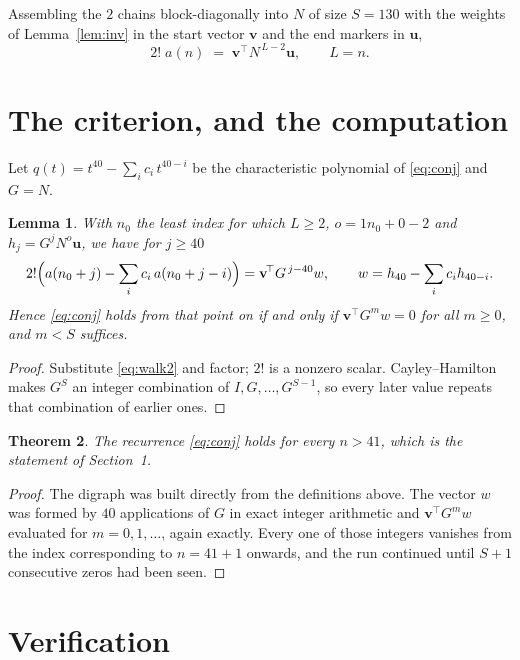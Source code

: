 \documentclass[11pt,a4paper]{article}
\theoremstyle{plain}
\newtheorem{theorem}{Theorem}
\newtheorem{lemma}[theorem]{Lemma}
\theoremstyle{definition}
\begin{document}
Assembling the $2$ chains block-diagonally into $N$ of size $S=130$ with the weights of
Lemma~\ref{lem:inv} in the start vector $\mathbf{v}$ and the end markers in
$\mathbf{u}$,
\begin{equation}\label{eq:walk2}
2!\;a(n)\;=\;\mathbf{v}^{\!\top}N^{\,L-2}\mathbf{u},\qquad L=n .
\end{equation}

\section{The criterion, and the computation}

Let $q(t)=t^{40}-\sum_i c_i\,t^{40-i}$ be the characteristic polynomial of
\eqref{eq:conj} and $G=N$.

\begin{lemma}\label{lem:crit}
With $n_0$ the least index for which $L\ge2$, $o=1n_0+0-2$ and
$h_j=G^{j}N^{o}\mathbf{u}$, we have for $j\ge40$
\[
2!\Bigl(a(n_0+j)-\sum_i c_i\,a(n_0+j-i)\Bigr)=\mathbf{v}^{\!\top}G^{\,j-40}w,
\qquad w=h_{40}-\sum_i c_i h_{40-i} .
\]
Hence \eqref{eq:conj} holds from that point on if and only if
$\mathbf{v}^{\!\top}G^{m}w=0$ for all $m\ge0$, and $m<S$ suffices.
\end{lemma}

\begin{proof}
Substitute \eqref{eq:walk2} and factor; $2!$ is a nonzero scalar. Cayley--Hamilton
makes $G^{S}$ an integer combination of $I,G,\dots,G^{S-1}$, so every later value repeats
that combination of earlier ones.
\end{proof}

\begin{theorem}
The recurrence \eqref{eq:conj} holds for every $n>41$, which is the statement of
Section~1.
\end{theorem}

\begin{proof}
The digraph was built directly from the definitions above. The vector $w$ was formed by
$40$ applications of $G$ in exact integer arithmetic and $\mathbf{v}^{\!\top}G^{m}w$
evaluated for $m=0,1,\dots$, again exactly. Every one of those integers vanishes from the
index corresponding to $n=41+1$ onwards, and the run continued until $S+1$ consecutive
zeros had been seen.
\end{proof}

\section{Verification}
\end{document}

